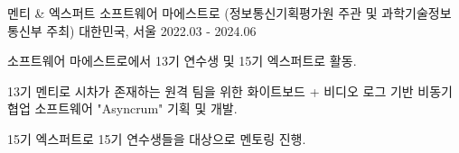 \begin{cventries}
  \cventry
    {멘티 \& 엑스퍼트} %
    {소프트웨어 마에스트로 (정보통신기획평가원 주관 및 과학기술정보통신부 주최)} %
    {대한민국, 서울} %
    {2022.03 - 2024.06} %
    {
      \begin{cvitems} %
        \item {소프트웨어 마에스트로에서 13기 연수생 및 15기 엑스퍼트로 활동.}
        \item {13기 멘티로 시차가 존재하는 원격 팀을 위한 화이트보드 + 비디오 로그 기반 비동기 협업 소프트웨어 "Asyncrum" 기획 및 개발.}
        \item {15기 엑스퍼트로 15기 연수생들을 대상으로 멘토링 진행.}
      \end{cvitems}
    }

\end{cventries}
